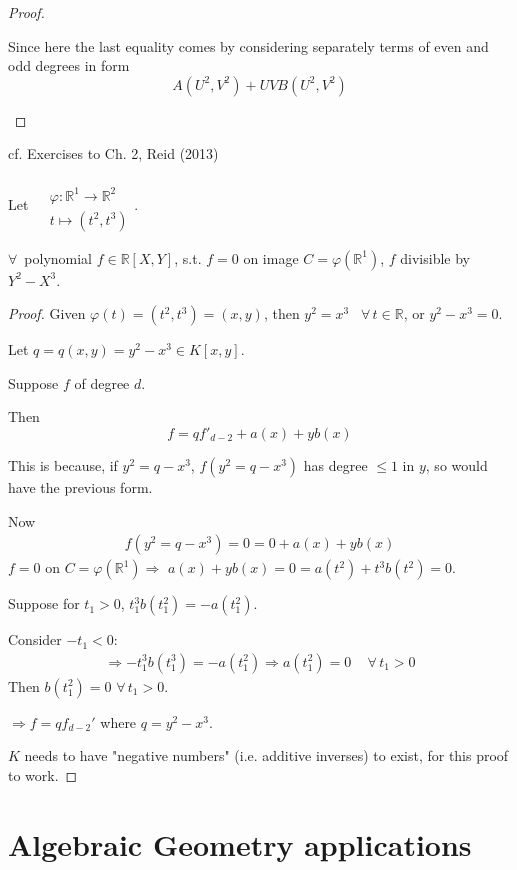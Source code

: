 \documentclass[10pt]{amsart}
\newcommand{\exercisehead}[1]
  { \smallskip
   \noindent{\small\bf Exercise #1.}
  }
\begin{document}
\begin{multicols*}{2}
\begin{proof}
\begin{enumerate}
	Since here the last equality comes by considering separately terms of even and odd degrees in form 
	\[
	A(U^2, V^2)  + UVB(U^2, V^2)
	\]
	
\end{enumerate}	
\end{proof}

cf. Exercises to Ch. 2, Reid (2013)

\exercisehead{2.2}
Let $\begin{aligned} & \quad \\ 
& \varphi : \mathbb{R}^1 \to \mathbb{R}^2	\\
& t \mapsto (t^2, t^3) \end{aligned}$. 

$\forall \, $ polynomial $f \in \mathbb{R}[X, Y]$, s.t. $f= 0$ on image $C = \varphi(\mathbb{R}^1)$, $f$ divisible by $Y^2 - X^3$. 

\begin{proof}
	Given $\varphi(t) = (t^2, t^3) = (x,y)$, then $y^2 = x^3$ \, $\forall \, t \in \mathbb{R}$, or $y^2 - x^3 = 0$.
	
	Let $q= q(x,y) = y^2 - x^3 \in K[x,y]$.
	
	Suppose $f$ of degree $d$.
	
	Then 
	\[
	f = q f'_{d-2} + a(x) + y b(x)
	\]
	
	This is because, if $y^2 = q- x^3$, $f(y^2 = q- x^3)$ has degree $\leq 1$ in $y$, so would have the previous form.
	
	Now 
	\[
	\begin{gathered}
	f(y^2 = q- x^3) = 0 = 0 + a(x) + yb(x)
	\end{gathered}
	\]
	$f = 0$ on $C = \varphi(\mathbb{R}^1) \Longrightarrow $ $a(x) + yb(x) =0 = a(t^2) + t^3 b(t^2) = 0$.
	
	Suppose for $t_1 > 0$, $t_1^3 b(t_1^2) = -a(t_1^2)$. 
	
	Consider $-t_1 < 0$: 
	\[
	\begin{gathered}
	\Longrightarrow -t_1^3 b(t_1^3) = -a(t_1^2) \Longrightarrow a(t_1^2) = 0 \quad \, \forall \, t_1 >0
	\end{gathered}
	\]
	Then $b(t_1^2) = 0$ $\forall \, t_1 > 0$.
	
	$\Longrightarrow f = qf_{d-2}'$ where $q = y^2-x^3$.
	
	$K$ needs to have "negative numbers" (i.e. additive inverses) to exist, for this proof to work.
	\end{proof}	

\part{Algebraic Geometry applications}


\end{multicols*}
\end{document}
